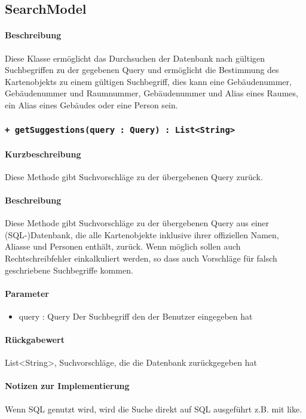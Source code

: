 \subsection{SearchModel}
\paragraph*{Beschreibung}
Diese Klasse ermöglicht das Durchsuchen der Datenbank nach gültigen Suchbegriffen zu der gegebenen Query 
und ermöglicht die Bestimmung des Kartenobjekts zu einem gültigen Suchbegriff, 
dies kann eine Gebäudenummer, Gebäudenummer und Raumnummer, Gebäudenummer und Alias eines Raumes, ein Alias eines Gebäudes oder eine Person sein.

\subsubsection{\texttt{+ getSuggestions(query : Query) : List<String>}}%
\paragraph*{Kurzbeschreibung}
Diese Methode gibt Suchvorschläge zu der übergebenen Query zurück.
\paragraph*{Beschreibung}
Diese Methode gibt Suchvorschläge zu der übergebenen Query aus einer (SQL-)Datenbank, 
die alle Kartenobjekte inklusive ihrer offiziellen Namen, Aliasse und Personen enthält, zurück.
Wenn möglich sollen auch Rechtschreibfehler einkalkuliert werden, so dass auch Vorschläge für falsch geschriebene Suchbegriffe kommen.
\paragraph*{Parameter}
\begin{itemize}
    \item query : Query Der Suchbegriff den der Benutzer eingegeben hat
\end{itemize}
\paragraph*{Rückgabewert}
List<String>, Suchvorschläge, die die Datenbank zurückgegeben hat
\paragraph*{Notizen zur Implementierung}
Wenn SQL genutzt wird, wird die Suche direkt auf SQL ausgeführt z.B. mit \dq like\dq{}.

